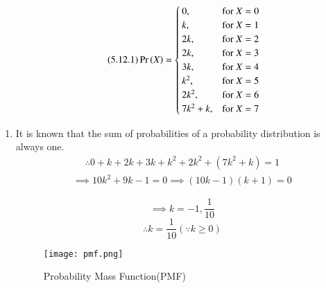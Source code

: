 \documentclass[journal,12pt,twocolumn]{IEEEtran}
\begin{document}
\begin{align}
 \tag{5.12.1}
 \Pr\left(X\right) = 
  \begin{cases}
    0, & \text{for }  X = 0 \\
    k, & \text{for }  X = 1 \\
    2k, & \text{for } X = 2 \\
    2k, & \text{for } X = 3 \\
    3k, & \text{for } X = 4 \\
    k^2, & \text{for } X = 5 \\
    2k^2, & \text{for } X = 6 \\
    7k^2 + k, & \text{for } X = 7 \\
    \end{cases}
  \end{align}
\begin{enumerate}
    \item It is known that the sum of probabilities of a probability distribution is always one. 
\begin{align}
\tag{5.12.2}
    \therefore 0 + k + 2k + 3k + k^2 + 2k^2 + (7k^2 + k) = 1 
\end{align}
\begin{align}
\tag{5.12.3}
\implies 10k^2 + 9k - 1 = 0 
 \implies  (10k - 1)(k + 1) = 0
 \end{align}
 
  \begin{equation}
  \tag{5.12.4}
 \implies  k = -1, \frac{1}{10} 
\end{equation}
\begin{equation}
    \tag{1}
 \therefore k = \frac{1}{10} (\because k \ge 0)
 \end{equation}
 
 \begin{figure}[!htb]
    \centering    
	\texttt{[image: pmf.png]}
    \caption{Probability Mass Function(PMF)}
    \label{Fig:1}
\end{figure}


\end{enumerate}
\end{document}
